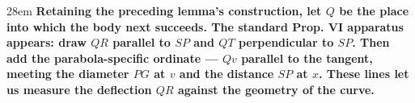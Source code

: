 \documentclass[border=4pt]{standalone}
\begin{document}
\begin{varwidth}{28em}
\large\bfseries
Retaining the preceding lemma's construction, let $Q$ be the place into which the body      next succeeds. The standard Prop. VI apparatus appears: draw $QR$ parallel      to $SP$ and $QT$ perpendicular to $SP$. Then add the parabola-specific ordinate —      $Qv$ parallel to the tangent, meeting the diameter $PG$ at $v$ and the      distance $SP$ at $x$. These lines let us measure the deflection $QR$ against the geometry      of the curve.
\end{varwidth}
\end{document}
